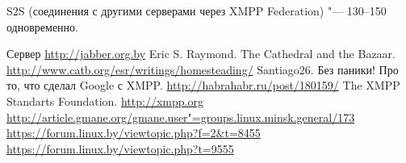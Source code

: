 \documentclass[10pt, a5paper]{article}
\begin{document}
S2S (соединения с другими серверами через XMPP Federation) "--- 130--150 одновременно.


\begin{thebibliography}{9}
   Сервер \url{http://jabber.org.by}
   Eric S. Raymond. The Cathedral and the Bazaar. \url{http://www.catb.org/esr/writings/homesteading/}
   Santiago26. Без паники! Про то, что сделал Google с XMPP. \url{http://habrahabr.ru/post/180159/}
   The XMPP Standarts Foundation. \url{http://xmpp.org}
 \url{http://article.gmane.org/gmane.user"=groups.linux.minsk.general/173}
 \url{https://forum.linux.by/viewtopic.php?f=2&t=8455}
  \url{https://forum.linux.by/viewtopic.php?t=9555}
\end{thebibliography}
\end{document}
